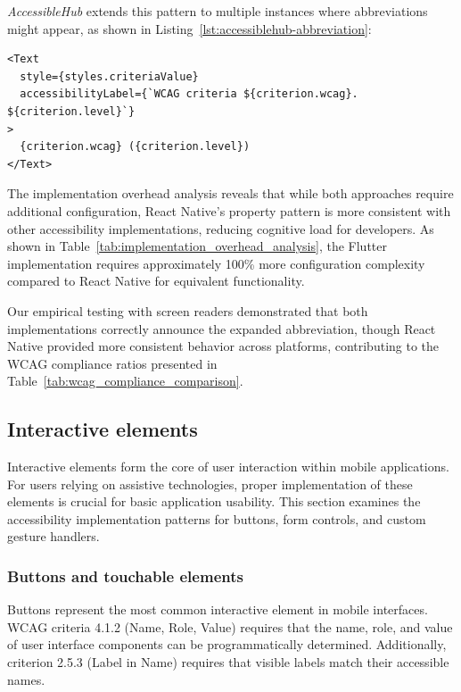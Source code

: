 \textit{AccessibleHub} extends this pattern to multiple instances where abbreviations might appear, as shown in Listing~\ref{lst:accessiblehub-abbreviation}:

\begin{lstlisting}[style=ReactNativeStyle, caption=Enhanced abbreviation handling in AccessibleHub, label=lst:accessiblehub-abbreviation]
<Text
  style={styles.criteriaValue}
  accessibilityLabel={`WCAG criteria ${criterion.wcag}. ${criterion.level}`}
>
  {criterion.wcag} ({criterion.level})
</Text>
\end{lstlisting}

\pagebreak

The implementation overhead analysis reveals that while both approaches require additional configuration, React Native's property pattern is more consistent with other accessibility implementations, reducing cognitive load for developers. As shown in Table~\ref{tab:implementation_overhead_analysis}, the Flutter implementation requires approximately 100\% more configuration complexity compared to React Native for equivalent functionality.

Our empirical testing with screen readers demonstrated that both implementations correctly announce the expanded abbreviation, though React Native provided more consistent behavior across platforms, contributing to the WCAG compliance ratios presented in Table~\ref{tab:wcag_compliance_comparison}.

\subsection{Interactive elements}
\label{subsec:interactive-elements}

Interactive elements form the core of user interaction within mobile applications. For users relying on assistive technologies, proper implementation of these elements is crucial for basic application usability. This section examines the accessibility implementation patterns for buttons, form controls, and custom gesture handlers.

\subsubsection{Buttons and touchable elements}
\label{subsubsec:buttons-implementation}

Buttons represent the most common interactive element in mobile interfaces. WCAG criteria 4.1.2 (Name, Role, Value) requires that the name, role, and value of user interface components can be programmatically determined. Additionally, criterion 2.5.3 (Label in Name) requires that visible labels match their accessible names.

